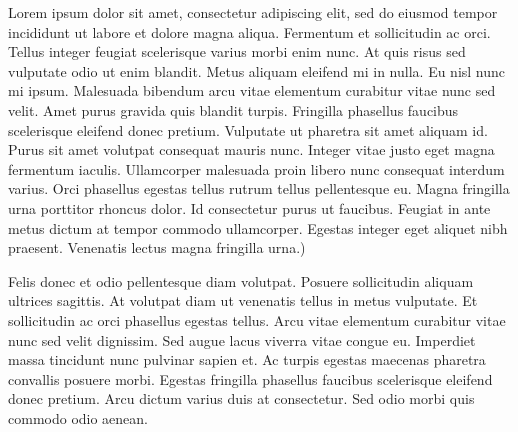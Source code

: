\documentclass[10pt]{article} %
\newenvironment{BoxedInternal}[1][]
{%
  \begin{changemargin}{0cm}{0cm}%
    \begin{mdframed}[roundcorner=5pt,backgroundcolor=swred,outermargin  =-0.5in,innermargin =-0.5in, topline=false, bottomline=false, rightline=false, leftline=false,#1]
    }{%
    \end{mdframed}%
  \end{changemargin}%
}
\newcommand*{\noind}{\setlength{\parindent}{0cm}} %
\newcommand{\bighdr}[2][]{%
\vspace{2pt}
  \begin{BoxedInternal}[#1]{}
    \color{white}\huge\bfseries\headingfont\filcenter{#2}
  \end{BoxedInternal}\vspace{-8pt}%
}
\begin{document}
\begin{multicols}{2} %
{\noind %
Lorem ipsum dolor sit amet, consectetur adipiscing elit, sed do eiusmod tempor incididunt ut labore et dolore magna aliqua. Fermentum et sollicitudin ac orci. Tellus integer feugiat scelerisque varius morbi enim nunc. At quis risus sed vulputate odio ut enim blandit. Metus aliquam eleifend mi in nulla. Eu nisl nunc mi ipsum. Malesuada bibendum arcu vitae elementum curabitur vitae nunc sed velit. Amet purus gravida quis blandit turpis. Fringilla phasellus faucibus scelerisque eleifend donec pretium. Vulputate ut pharetra sit amet aliquam id. Purus sit amet volutpat consequat mauris nunc. Integer vitae justo eget magna fermentum iaculis. Ullamcorper malesuada proin libero nunc consequat interdum varius. Orci phasellus egestas tellus rutrum tellus pellentesque eu. Magna fringilla urna porttitor rhoncus dolor. Id consectetur purus ut faucibus. Feugiat in ante metus dictum at tempor commodo ullamcorper. Egestas integer eget aliquet nibh praesent. Venenatis lectus magna fringilla urna.)
} %

\bighdr{INTRODUCTION} %
{\noind
Felis donec et odio pellentesque diam volutpat. Posuere sollicitudin aliquam ultrices sagittis. At volutpat diam ut venenatis tellus in metus vulputate. Et sollicitudin ac orci phasellus egestas tellus. Arcu vitae elementum curabitur vitae nunc sed velit dignissim. Sed augue lacus viverra vitae congue eu. Imperdiet massa tincidunt nunc pulvinar sapien et. Ac turpis egestas maecenas pharetra convallis posuere morbi. Egestas fringilla phasellus faucibus scelerisque eleifend donec pretium. Arcu dictum varius duis at consectetur. Sed odio morbi quis commodo odio aenean.
}


\end{multicols}
\end{document}

